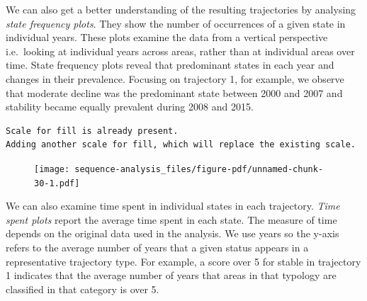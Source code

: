 \documentclass[
  letterpaper,
  DIV=11,
  numbers=noendperiod]{scrreprt}
\newenvironment{Shaded}{\begin{snugshade}}{\end{snugshade}}
\newcommand{\AttributeTok}[1]{\textcolor[rgb]{0.40,0.45,0.13}{#1}}
\newcommand{\CommentTok}[1]{\textcolor[rgb]{0.37,0.37,0.37}{#1}}
\newcommand{\DecValTok}[1]{\textcolor[rgb]{0.68,0.00,0.00}{#1}}
\newcommand{\FunctionTok}[1]{\textcolor[rgb]{0.28,0.35,0.67}{#1}}
\newcommand{\NormalTok}[1]{\textcolor[rgb]{0.00,0.23,0.31}{#1}}
\newcommand{\SpecialCharTok}[1]{\textcolor[rgb]{0.37,0.37,0.37}{#1}}
\begin{document}
We can also get a better understanding of the resulting trajectories by
analysing \emph{state frequency plots}. They show the number of
occurrences of a given state in individual years. These plots examine
the data from a vertical perspective i.e.~looking at individual years
across areas, rather than at individual areas over time. State frequency
plots reveal that predominant states in each year and changes in their
prevalence. Focusing on trajectory 1, for example, we observe that
moderate decline was the predominant state between 2000 and 2007 and
stability became equally prevalent during 2008 and 2015.

\begin{Shaded}
\end{Shaded}

\begin{verbatim}
Scale for fill is already present.
Adding another scale for fill, which will replace the existing scale.
\end{verbatim}

\begin{figure}[H]

{\centering \texttt{[image: sequence-analysis\_files/figure-pdf/unnamed-chunk-30-1.pdf]}

}

\end{figure}

We can also examine time spent in individual states in each trajectory.
\emph{Time spent plots} report the average time spent in each state. The
measure of time depends on the original data used in the analysis. We
use years so the y-axis refers to the average number of years that a
given status appears in a representative trajectory type. For example, a
score over 5 for stable in trajectory 1 indicates that the average
number of years that areas in that typology are classified in that
category is over 5.
\end{document}
